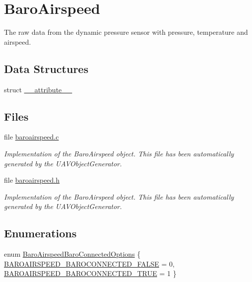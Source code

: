 \hypertarget{group___baro_airspeed}{\section{\-Baro\-Airspeed}
\label{group___baro_airspeed}
}


\-The raw data from the dynamic pressure sensor with pressure, temperature and airspeed.  


\subsection*{\-Data \-Structures}
\begin{DoxyCompactItemize}
\item 
struct \hyperlink{struct____attribute____}{\-\_\-\-\_\-attribute\-\_\-\-\_\-}
\end{DoxyCompactItemize}
\subsection*{\-Files}
\begin{DoxyCompactItemize}
\item 
file \hyperlink{baroairspeed_8c}{baroairspeed.\-c}
\begin{DoxyCompactList}\small\item\em \-Implementation of the \-Baro\-Airspeed object. \-This file has been automatically generated by the \-U\-A\-V\-Object\-Generator. \end{DoxyCompactList}\item 
file \hyperlink{baroairspeed_8h}{baroairspeed.\-h}
\begin{DoxyCompactList}\small\item\em \-Implementation of the \-Baro\-Airspeed object. \-This file has been automatically generated by the \-U\-A\-V\-Object\-Generator. \end{DoxyCompactList}\end{DoxyCompactItemize}
\subsection*{\-Enumerations}
\begin{DoxyCompactItemize}
\item 
enum \hyperlink{group___baro_airspeed_ga45daf3564b334f5b8f901b54d13e5cf9}{\-Baro\-Airspeed\-Baro\-Connected\-Options} \{ \hyperlink{group___baro_airspeed_gga45daf3564b334f5b8f901b54d13e5cf9a6d9369ef7d2ae77fc5dc84877f7c5667}{\-B\-A\-R\-O\-A\-I\-R\-S\-P\-E\-E\-D\-\_\-\-B\-A\-R\-O\-C\-O\-N\-N\-E\-C\-T\-E\-D\-\_\-\-F\-A\-L\-S\-E} = 0, 
\hyperlink{group___baro_airspeed_gga45daf3564b334f5b8f901b54d13e5cf9a2f3e3468214827349cb5b63d35291849}{\-B\-A\-R\-O\-A\-I\-R\-S\-P\-E\-E\-D\-\_\-\-B\-A\-R\-O\-C\-O\-N\-N\-E\-C\-T\-E\-D\-\_\-\-T\-R\-U\-E} = 1
 \}
\end{DoxyCompactItemize}
